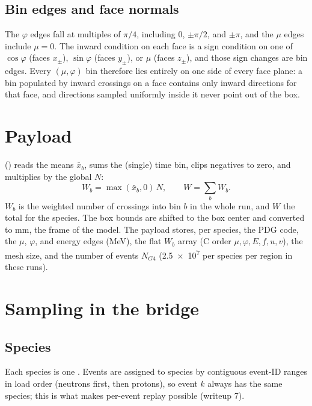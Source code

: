 \subsection{Bin edges and face normals}
The $\varphi$ edges fall at multiples of $\pi/4$, including $0$, $\pm\pi/2$, and $\pm\pi$, and the $\mu$ edges include $\mu=0$. The inward condition on each face is a sign condition on one of $\cos\varphi$ (faces $x_\pm$), $\sin\varphi$ (faces $y_\pm$), or $\mu$ (faces $z_\pm$), and those sign changes are bin edges. Every $(\mu,\varphi)$ bin therefore lies entirely on one side of every face plane: a bin populated by inward crossings on a face contains only inward directions for that face, and directions sampled uniformly inside it never point out of the box.

\section{Payload}
 () reads the  means $\bar x_b$, sums the (single) time bin, clips negatives to zero, and multiplies by the global $N$:
\begin{equation}
  W_b = \max(\bar x_b,0)\,N,\qquad W = \sum_b W_b .
\end{equation}
$W_b$ is the weighted number of crossings into bin $b$ in the whole \mcdc{} run, and $W$ the total for the species. The box bounds are shifted to the box center and converted to mm, the frame of the \gfour{} model. The payload stores, per species, the PDG code, the $\mu$, $\varphi$, and energy edges (MeV), the flat $W_b$ array (C order $\mu,\varphi,E,f,u,v$), the mesh size, and the number of \gfour{} events $N_{G4}$ (\num{2.5e7} per species per region in these runs).

\section{Sampling in the bridge}
\subsection{Species}
Each species is one . Events are assigned to species by contiguous event-ID ranges in load order (neutrons first, then protons), so event $k$ always has the same species; this is what makes per-event replay possible (writeup 7).

